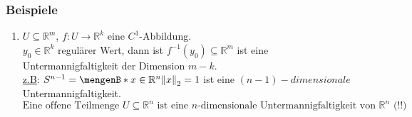 \subsubsection{Beispiele} %
\label{ssub:beispiele}
\begin{enumerate}
	\item $U \subseteq \mathbb{R}^m$, $f: U \to \mathbb{R}^k $ eine $C^1$-Abbildung. \\
	$y_0 \in \mathbb{R}^k$ regulärer Wert, dann ist $f^{-1}(y_0) \subseteq \mathbb{R}^m$ ist eine Untermannigfaltigkeit der Dimension $m-k$. \\
	\underline{z.B}: $S^{n-1}= \set[x \in \mathbb{R}^n]{\norm{x}_2=1}$ ist eine $(n-1)-dimensionale$ Untermannigfaltigkeit. \\
	\[
		\text{Eine offene Teilmenge $U \subseteq \mathbb{R}^n$ ist eine $n$-dimensionale Untermannigfaltigkeit von $\mathbb{R}^n$ (!!)}
	\]
\end{enumerate}

	